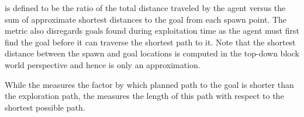 \emph{\DistanceInefficiency{}} is defined to be the ratio of the total distance traveled by the agent versus the sum of approximate shortest distances to the goal from each spawn point. The metric also disregards goals found during exploitation time as the agent must first find the goal before it can traverse the shortest path to it.
Note that the shortest distance between the spawn and goal locations is computed in the top-down block world perspective and hence is only an approximation.

While the \LatencyOneGtOne{} measures the factor by which planned path to the goal is shorter than the exploration path, the \DistanceInefficiency{} measures the length of this path with respect to the shortest possible path. 

